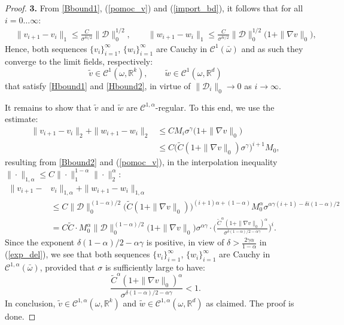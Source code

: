 \documentclass[reqno,twoside,11pt]{amsart}
\newcommand{\R}{\mathbb{R}}
\numberwithin{equation}{section}
\theoremstyle{plain}
\theoremstyle{definition}
\begin{document}
\begin{proof}
\medskip

{\bf 3.} From \ref{Bbound1}, (\ref{pomoc_v}) and (\ref{import_bd}), it follows that for all $i=0\ldots \infty$:
\begin{equation*}
\begin{split}
& \|v_{i+1} - v_i\|_1\leq \frac{C}{\sigma^{\delta
    i/2}}\|\mathcal{D}\|_0^{1/2}, \qquad \|w_{i+1} - w_i\|_1\leq \frac{C}{\sigma^{\delta
    i/2}}\|\mathcal{D}\|_0^{1/2} \big(1+ \|\nabla v\|_0\big),
\end{split}
\end{equation*}
Hence, both sequences $\{v_i\}_{i=1}^\infty$, 
$\{w_i\}_{i=1}^\infty$ are Cauchy in $\mathcal{C}^1(\bar\omega)$ and as
such they converge to the limit fields, respectively: 
$$\tilde v\in\mathcal{C}^1(\omega,\R^k), \qquad \tilde w\in\mathcal{C}^1(\omega,\R^d)$$ 
that satisfy \ref{Hbound1} and \ref{Hbound2}, in virtue of
$\|\mathcal{D}_i\|_0\to 0$ as $i\to\infty$. 

\smallskip

It remains to show that $\tilde v$ and $\tilde w$ are
$\mathcal{C}^{1,\alpha}$-regular. To this end, we use the estimate:
\begin{equation*}
\begin{split}
\|v_{i+1} - v_i\|_2 + \|w_{i+1} - w_i\|_2 & \leq {C}M_i{\sigma^\gamma}
\big(1+ \|\nabla v\|_0\big) \\ & \leq C \Big(\tilde C (1+\|\nabla
v\|_0)\sigma^\gamma\Big)^{i+1} M_0, 
\end{split}
\end{equation*}
resulting from \ref{Bbound2} and (\ref{pomoc_v}), in the
interpolation inequality $\|\cdot\|_{1,\alpha}\leq C \|\cdot\|_{1}^{1-\alpha}\|\cdot\|_{2}^\alpha$:
\begin{equation*}
\begin{split}
\|v_{i+1} -& v_i\|_{1,\alpha}  + \|w_{i+1} - w_i\|_{1,\alpha} \\ & \leq {C}
\|\mathcal{D}\|_0^{(1-\alpha)/2} \Big(\tilde C (1+\|\nabla
v\|_0)\Big)^{(i+1)\alpha+(1-\alpha)} M_0^\alpha \sigma^{\alpha\gamma(i+1) - \delta i (1-\alpha)/2}
\\ & = {C} \tilde C \cdot M_0^\alpha\|\mathcal{D}\|_0^{(1-\alpha)/2} \big(1+\|\nabla
v\|_0\big) \sigma^{\alpha\gamma} \cdot \Big(\frac{\tilde C^\alpha (1+\|\nabla v\|_0)^{\alpha}}{
\sigma^{\delta (1-\alpha)/2-\alpha\gamma}}\Big)^i.
\end{split}
\end{equation*}
Since the exponent $\delta (1-\alpha)/2-\alpha\gamma$ is positive, in
view of $\delta>\frac{2\gamma\alpha}{1-\alpha}$ in (\ref{exp_del}), we
see that both sequences $\{v_i\}_{i=1}^\infty$, $\{w_i\}_{i=1}^\infty$ are Cauchy in
$\mathcal{C}^{1,\alpha}(\bar\omega)$, provided that $\sigma$ is
sufficiently large to have:
$$\frac{\tilde C^\alpha (1+\|\nabla v\|_0)^{\alpha}}{
\sigma^{\delta (1-\alpha)/2-\alpha\gamma}} <1.$$
In conclusion, $\tilde v\in\mathcal{C}^{1,\alpha}(\omega,\R^k)$ and
$\tilde w\in\mathcal{C}^{1,\alpha}(\omega,\R^d)$ as claimed. The proof
is done.
\end{proof}
\end{document}
